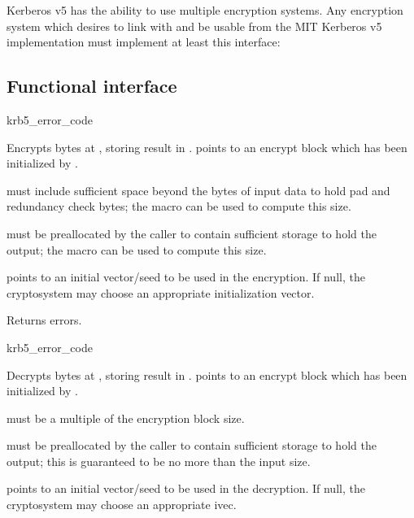 Kerberos v5 has the ability to use multiple encryption systems.  Any
encryption system which desires to link with and be usable from the MIT
Kerberos v5 implementation must implement at least this interface:

\subsection{Functional interface}

\begin{funcdecl}{krb5_error_code}{\funcvoid}
\end{funcdecl}
Encrypts  bytes at , storing result in
.   points to an encrypt block which
has been initialized by .

 must include sufficient space beyond the 
bytes of input data to hold pad and redundancy check bytes; the macro
 can be used to compute this size.

 must be preallocated by the caller to contain sufficient
storage to hold the output; the macro  can
be used to compute this size.

 points to an initial vector/seed to be used in the encryption.
If null, the cryptosystem may choose an appropriate initialization vector.

Returns errors.

\begin{funcdecl}{krb5_error_code}{\funcvoid}
\end{funcdecl}
Decrypts  bytes at , storing result in
.
 points to an encrypt block which has been initialized
by .

 must be a multiple of the encryption block size.

 must be preallocated by the caller to contain sufficient
storage to hold the output; this is guaranteed to be no more than
the input size.

 points to an initial vector/seed to be used in the decryption.
If null, the cryptosystem may choose an appropriate ivec.

